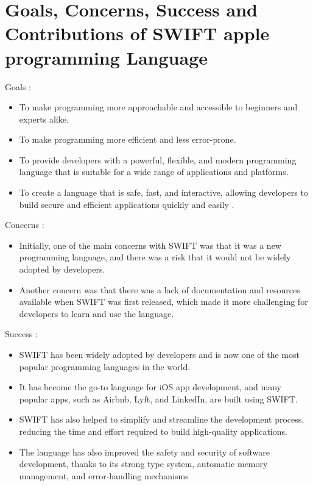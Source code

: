 \documentclass[11pt]{Abdullahmad} %
\begin{document}

\section*{Goals, Concerns, Success and Contributions of SWIFT apple programming Language}

Goals :
\begin{itemize}
	\item To make programming more approachable and accessible to beginners and experts alike.
	\item To make programming more efficient and less error-prone.
	\item To provide developers with a powerful, flexible, and modern programming language that is suitable for a wide range of applications and platforms.
        \item To create a language that is safe, fast, and interactive, allowing developers to build
      secure and efficient applications quickly and easily \cite{miller2001swift}.
\end{itemize}

Concerns :
\begin{itemize}
	\item Initially, one of the main concerns with SWIFT was that it was a new  programming
      language, and there was a risk that it would not be widely adopted by developers.
	\item Another concern was that there was a lack of documentation and resources 
      available when SWIFT was first released, which made it more challenging for
      developers to learn and use the language.
\end{itemize}

Success :
\begin{itemize}
	\item SWIFT has been widely adopted by developers and is now one of the most popular
       programming languages in the world.
	\item It has become the go-to language for iOS app development, and many popular apps, such 
       as Airbnb, Lyft, and LinkedIn, are built using SWIFT.
	\item SWIFT has also helped to simplify and streamline the development process, reducing the time
       and effort required to build high-quality applications.
        \item The language has also improved the safety and security of software development, 
       thanks to its strong type system, automatic memory management, and error-handling mechanisms
\end{itemize}
\end{document}
